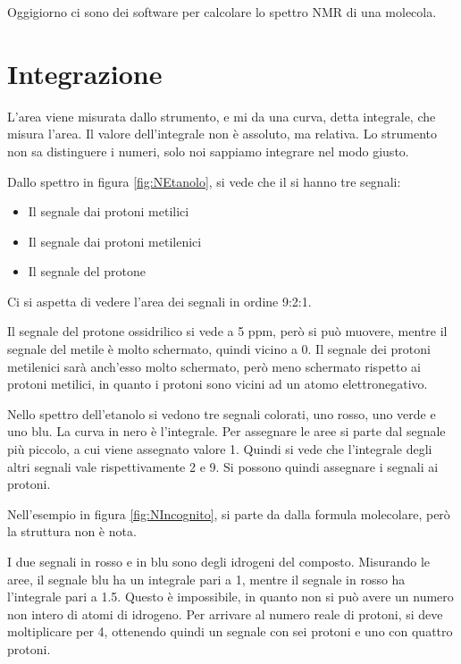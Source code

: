 Oggigiorno ci sono dei software per calcolare lo spettro NMR di una
molecola.

\section{Integrazione}

L'area viene misurata dallo strumento, e mi da una curva, detta integrale, che misura l'area. Il valore dell'integrale non è assoluto, ma relativa. Lo strumento non sa
distinguere i numeri, solo noi sappiamo integrare nel modo giusto.


Dallo spettro in figura \ref{fig:NEtanolo}, si vede che il si hanno tre segnali:
\begin{itemize}
  \item Il segnale dai protoni metilici 
  \item Il segnale dai protoni metilenici 
  \item Il segnale del protone 
\end{itemize}
Ci si aspetta di vedere l'area dei segnali in ordine 9:2:1.

Il segnale del protone ossidrilico si vede a 5 ppm, però si può muovere, mentre il segnale del
metile è molto schermato, quindi vicino a 0.
Il segnale dei protoni metilenici sarà anch'esso molto schermato, però meno schermato rispetto ai protoni metilici, in quanto i protoni sono vicini ad un atomo elettronegativo.


Nello spettro dell'etanolo si vedono tre segnali colorati, uno rosso, uno verde e uno blu.
La curva in nero è l'integrale.
Per assegnare le aree si parte dal segnale più piccolo, a cui viene assegnato valore 1. Quindi si vede che l'integrale degli altri segnali vale rispettivamente 2 e 9.
Si possono quindi assegnare i segnali ai protoni.

Nell'esempio in figura \ref{fig:NIncognito}, si parte da dalla formula molecolare, però la struttura non è nota.


I due segnali in rosso e in blu sono degli idrogeni del composto. Misurando le aree, il segnale blu ha un integrale pari a 1, mentre il segnale in rosso ha l'integrale pari a 1.5. Questo è impossibile, in quanto non si può avere un numero non intero di atomi di idrogeno. Per arrivare al numero reale
di protoni, si deve moltiplicare per 4, ottenendo quindi un segnale con sei protoni e uno con quattro  protoni.

